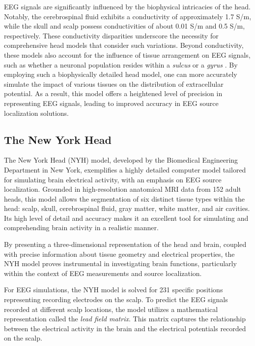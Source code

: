 \documentclass[a4paper, UKenglish, 11pt]{uiomaster}
\begin{document}
EEG signals are significantly influenced by the biophysical intricacies of the head. Notably, the cerebrospinal fluid exhibits a conductivity of approximately 1.7 S/m, while the skull and scalp possess conductivities of about 0.01 S/m and 0.5 S/m, respectively. These conductivity disparities underscore the necessity for comprehensive head models that consider such variations. Beyond conductivity, these models also account for the influence of tissue arrangement on EEG signals, such as whether a neuronal population resides within a \emph{sulcus} or a \emph{gyrus} \cite{naess2021biophysically}. By employing such a biophysically detailed head model, one can more accurately simulate the impact of various tissues on the distribution of extracellular potential. As a result, this model offers a heightened level of precision in representing EEG signals, leading to improved accuracy in EEG source localization solutions.

\subsection{The New York Head}
The New York Head (NYH) model, developed by the Biomedical Engineering Department in New York, exemplifies a highly detailed computer model tailored for simulating brain electrical activity, with an emphasis on EEG source localization. Grounded in high-resolution anatomical MRI data from 152 adult heads, this model allows the segmentation of six distinct tissue types within the head: scalp, skull, cerebrospinal fluid, gray matter, white matter, and air cavities. Its high level of detail and accuracy makes it an excellent tool for simulating and comprehending brain activity in a realistic manner.

By presenting a three-dimensional representation of the head and brain, coupled with precise information about tissue geometry and electrical properties, the NYH model proves instrumental in investigating brain functions, particularly within the context of EEG measurements and source localization.

For EEG simulations, the NYH model is solved for 231 specific positions representing recording electrodes on the scalp. To predict the EEG signals recorded at different scalp locations, the model utilizes a mathematical representation called the \emph{lead field matrix}. This matrix captures the relationship between the electrical activity in the brain and the electrical potentials recorded on the scalp.
\end{document}
